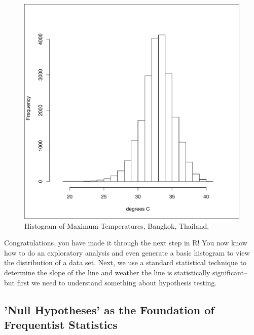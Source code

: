 \documentclass{article}\usepackage[]{graphicx}\usepackage[]{color}
\makeatletter
\def\maxwidth{ %
  \ifdim\Gin@nat@width>\linewidth
    \linewidth
  \else
    \Gin@nat@width
  \fi
}
\newenvironment{knitrout}{}{} %
\makeatother
\begin{document}
\begin{figure}[h]%
\begin{center}

\begin{knitrout}
\color{fgcolor}
\includegraphics[width=\maxwidth]{figure/fig:histogram-1} 

\end{knitrout}
\caption{Histogram of Maximum Temperatures, Bangkok, Thailand.}
\label{fig:histogram}
\end{center}
\end{figure}

Congratulations, you have made it through the next step in R!  You now know how to do an exploratory analysis and even generate a basic histogram to view the distribution of a data set. Next, we use a standard statistical technique to determine the slope of the line and weather the line is statistically significant-- but first we need to understand something about hypothesis testing.

\subsection{'Null Hypotheses' as the Foundation of Frequentist Statistics}
\end{document}
